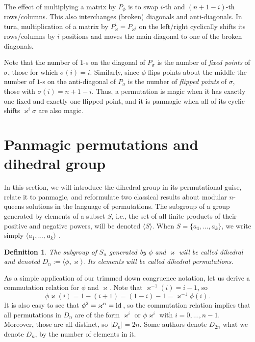 \documentclass[11pt]{article}
\theoremstyle{plain}
\newtheorem{definition}{Definition}
\theoremstyle{definition}
\newcommand{\+}[1]{{#1}^\times}
\def\s{{\sigma}}
\def\k{{\varkappa}}
\def\id{{\rm id\,}}
\begin{document}
The effect of multiplying a matrix by $P_{\phi}$ is to swap $i$-th and $(n+1-i)$-th rows/columns. This also interchanges (broken) diagonals and anti-diagonals. In turn, multiplication of a matrix by $P_{\k}^i=P_{\k^i}$ on the left/right cyclically shifts its rows/columns by $i$ positions and moves the main diagonal to one of the broken diagonals. 

Note that the number of $1$-s on the diagonal of $P_\s$ is the number of {\it fixed points} of $\s$, those for which $\s(i)=i$. Similarly, since $\phi$ flips points about the middle  the number of $1$-s on the anti-diagonal of $P_\s$ is the number of {\it flipped points} of $\s$, those with $\s(i)=n+1-i$. Thus, a permutation is magic when it has exactly one fixed and exactly one flipped point, and it is panmagic when all of its cyclic shifts $\k^i\s$ are also magic.



\section{Panmagic permutations and dihedral group}

In this section, we will introduce the dihedral group in its permutational guise, relate it to panmagic, and reformulate two classical results about modular $n$-queens solutions in the language of permutations. The subgroup of a group generated by elements of a subset $S$, i.e., the set of all finite products of their positive and negative powers, will be denoted $\langle S\rangle$. When $S=\{a_1,\dots,a_k\}$, we write simply $\langle a_1,\dots,a_k\rangle$ .
\begin{definition}
The subgroup of $S_n$ generated by $\phi$ and $\k$ will be called dihedral and denoted $D_n:=\langle \phi,\k\rangle$. Its elements will be called dihedral permutations. 
\end{definition} 
\noindent As a simple application of our trimmed down congruence notation, let us derive a commutation relation for $\phi$ and $\k$. Note that $\k^{-1}(i)=i-1$, so
\begin{equation}\label{comphikappa}
\phi\k(i)=1-(i+1)=(1-i)-1=\k^{-1}\phi(i).
\end{equation}
It is also easy to see that $\phi^2=\k^{n}=\id$, so the commutation relation implies that all permutations in $D_n$ are of the form  $\k^i$ or $\phi\k^i$ with $i=0,\dots,n-1$. Moreover, those are all distinct, so $|D_{n}|=2n$. Some authors denote $D_{2n}$ what we denote $D_{n}$, by the number of elements in it. 
\end{document}
